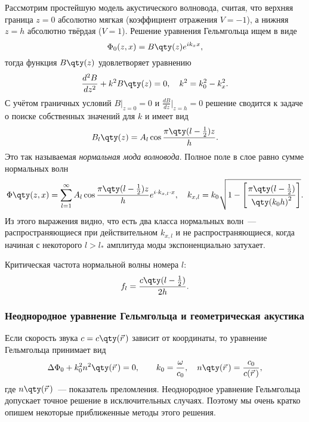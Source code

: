 Рассмотрим простейшую модель акустического волновода, считая, что верхняя граница $z=0$ абсолютно мягкая (коэффициент отражения $V=-1$), а нижняя $z=h$ абсолютно твёрдая ($V=1$). Решение уравнения Гельмгольца ищем в виде
\begin{equation}
	\Phi_0 (z,x)=B \qty(z) e^{i k_x x},
\end{equation}
тогда функция $B \qty(z)$ удовлетворяет уравнению
\begin{equation}
	\frac{{d}^2 B}{d z^2} + k^2 B \qty(z) =0, \quad k^2 = k_0^2 - k_x^2.
\end{equation}
С учётом граничных условий $B\big|_{z=0}=0$ и  $\frac{dB}{dz}\big|_{z=h}=0$ решение сводится к задаче о поиске собственных значений для $k$ и имеет вид
\begin{equation}
    B_l \qty(z) = A_l \cos \frac{\pi \qty(l- \frac{1}{2}) z}{h}.
\end{equation}
Это так называемая \textit{нормальная мода волновода}. Полное поле в слое равно сумме нормальных волн
\begin{equation}
	\Phi \qty(z,x) = \sum_{l=1}^\infty A_l \cos \frac{\pi \qty(l- \frac{1}{2}) z}{h} e^{i\cdot k_{x,l}\cdot x} , \quad k_{x,l} = k_0 \sqrt{1- \left[\frac{\pi \qty(l- \frac{1}{2})}{{\qty(k_0 h)}^2}\right]}.
\end{equation}
Из этого выражения видно, что есть два класса нормальных волн~--- распространяющиеся при действительном $k_{x,l}$ и не распространяющиеся, когда начиная с некоторого $l> l_*$ амплитуда моды экспоненциально затухает.

Критическая частота нормальной волны номера $l$:
\begin{equation}
    \label{eq:OJDuwz}
    f_l = \frac{c \qty(l- \frac{1}{2})}{2h}.
\end{equation}

\subsubsection{Неоднородное уравнение Гельмгольца и геометрическая акустика}

Если скорость звука $c=c \qty(\vec{r}\,)$ зависит от координаты, то уравнение Гельмгольца принимает вид
\begin{equation}
\Delta \Phi_0 + {k}_0^2 n^2 \qty(\vec{r}\,) =0, \quad { \quad k}_0 = \frac{\omega}{c_0}, \quad n \qty(\vec{r}\,) = \frac{c_0}{c(\vec{r}\,)},
\end{equation}
где $n \qty(\vec{r}\,)$~--- показатель преломления. Неоднородное уравнение Гельмгольца допускает точное решение в исключительных случаях. Поэтому мы очень кратко опишем некоторые приближенные методы этого решения.

